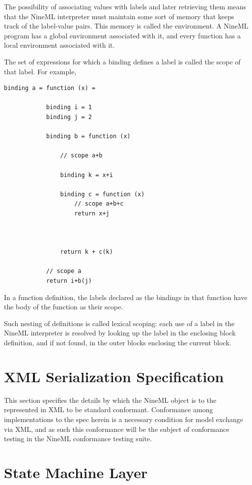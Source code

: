 \documentclass[a4paper]{article}
\begin{document}
The possibility of associating values with labels and later
retrieving them means that the NineML interpreter must maintain some
sort of memory that keeps track of the label-value pairs. This memory
is called the environment. A NineML program has a global environment
associated with it, and every function has a local
environment associated with it.

The set of expressions for which a binding defines a label is called
the scope of that label.  For example,

\begin{lstlisting}[style=display]
binding a = function (x) =

            binding i = 1
            binding j = 2

            binding b = function (x)

                // scope a+b

                binding k = x+i

                binding c = function (x)
                    // scope a+b+c
                    return x+j

 

                return k + c(k)

            // scope a
            return i+b(j)

\end{lstlisting}
 

In a function definition, the labels declared as the bindings in that
function have the body of the function as their scope.

Such nesting of definitions is called lexical scoping: each use of a
label in the NineML interpreter is resolved by looking up the label in
the enclosing block definition, and if not found, in the outer blocks
enclosing the current block.


\section{XML Serialization Specification}

This section specifies the details by which the NineML object is to
the represented in XML to be standard conformant.  Conformance among
implementations to the spec herein is a necessary condition for model
exchange via XML, and as such this conformance will be the subject of
conformance testing in the NineML conformance testing suite.
 
\section{State Machine Layer}
\end{document}
